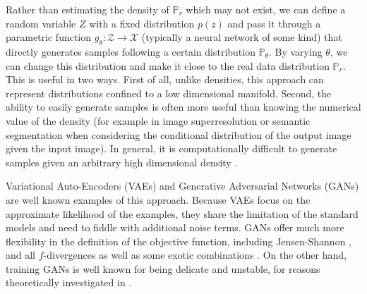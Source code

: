 \documentclass{article} %
\newcommand\PP{\mathbb{P}}
\theoremstyle{definition}
\theoremstyle{definition}
\begin{document}
Rather than estimating the density of $\PP_r$ which may not exist, we
can define a random variable $Z$ with a fixed distribution $p(z)$ and
pass it through a parametric function $g_\theta: \mathcal{Z} \rightarrow
\mathcal{X}$ (typically a neural network of some kind) that directly
generates samples following a certain distribution $\PP_\theta$. By
varying $\theta$, we can change this distribution and make it close to
the real data distribution $\PP_r$.  This is useful in two ways. First
of all, unlike densities, this approach can represent distributions
confined to a low dimensional manifold.  Second, the ability to easily
generate samples is often more useful than knowing the numerical value
of the density (for example in image superresolution or semantic
segmentation when considering the conditional distribution of the
output image given the input image). In general, it is computationally
difficult to generate samples given an arbitrary high dimensional
density \cite{Neal-AIS}.

Variational Auto-Encoders (VAEs) \cite{Kingma-ea-VAE} and Generative
Adversarial Networks (GANs) \cite{Good-ea-GAN} are well known examples
of this approach.  Because VAEs focus on the approximate likelihood of
the examples, they share the limitation of the standard models and
need to fiddle with additional noise terms. GANs offer much more
flexibility in the definition of the objective function, including
Jensen-Shannon \cite{Good-ea-GAN}, and all $f$-divergences
\cite{Nowo-ea-fgan} as well as some exotic combinations
\cite{Ferenc15}. On the other hand, training GANs is well known for
being delicate and unstable, for reasons theoretically investigated in
\cite{Arj-ea-Princ}.
\end{document}
